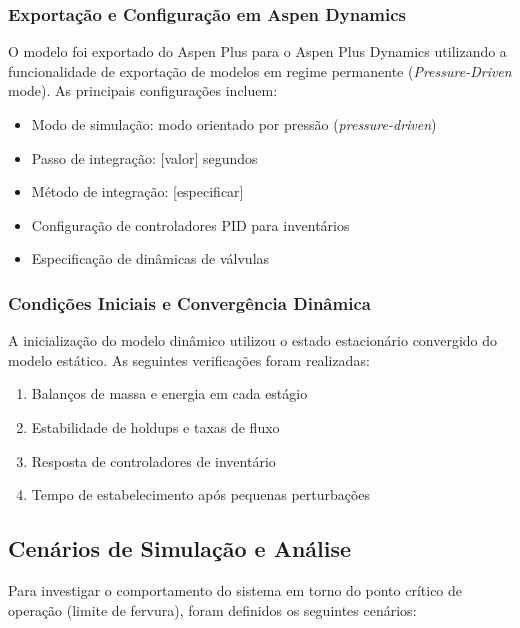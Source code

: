 \subsubsection{Exportação e Configuração em Aspen Dynamics}

O modelo foi exportado do Aspen Plus para o Aspen Plus Dynamics utilizando a funcionalidade de exportação de modelos em regime permanente (\emph{Pressure-Driven} mode). As principais configurações incluem:

\begin{itemize}[leftmargin=*]
  \item Modo de simulação: modo orientado por pressão (\emph{pressure-driven})
  \item Passo de integração: [valor] segundos
  \item Método de integração: [especificar]
  \item Configuração de controladores PID para inventários
  \item Especificação de dinâmicas de válvulas
\end{itemize}

\subsubsection{Condições Iniciais e Convergência Dinâmica}

A inicialização do modelo dinâmico utilizou o estado estacionário convergido do modelo estático. As seguintes verificações foram realizadas:

\begin{enumerate}
  \item Balanços de massa e energia em cada estágio
  \item Estabilidade de holdups e taxas de fluxo
  \item Resposta de controladores de inventário
  \item Tempo de estabelecimento após pequenas perturbações
\end{enumerate}

\subsection{Cenários de Simulação e Análise}\label{sec:cenarios}

Para investigar o comportamento do sistema em torno do ponto crítico de operação (limite de fervura), foram definidos os seguintes cenários:

